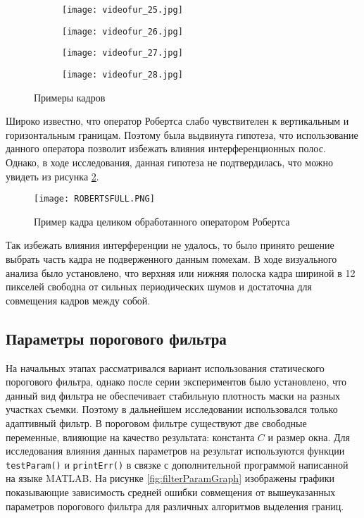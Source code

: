 \begin{figure}[h]
    \centering
    \begin{subfigure}{\textwidth}  
        \centering
        \texttt{[image: videofur\_25.jpg]}
        \smallskip 
    \end{subfigure}    
     \begin{subfigure}{\textwidth}  
        \centering
        \texttt{[image: videofur\_26.jpg]}        
        \smallskip 
    \end{subfigure}
     \begin{subfigure}{\textwidth}  
        \centering
        \texttt{[image: videofur\_27.jpg]}        
        \smallskip 
    \end{subfigure}
     \begin{subfigure}{\textwidth}  
        \centering
        \texttt{[image: videofur\_28.jpg]}
    \end{subfigure}

        \caption{Примеры кадров}
        \label{fig:semple}
\end{figure}

Широко известно, что оператор Робертса слабо чувствителен к вертикальным и горизонтальным границам. Поэтому была выдвинута гипотеза, что использование данного оператора позволит избежать влияния интерференционных полос. Однако, в ходе исследования, данная гипотеза не подтвердилась, что можно увидеть из рисунка \ref{fig:robertsComp}.
\begin{figure}
    \centering   
    \texttt{[image: ROBERTSFULL.PNG]} 
    \caption{Пример кадра целиком обработанного оператором Робертса}
    \label{fig:robertsComp}
\end{figure}
Так избежать влияния интерференции не удалось, то было принято решение выбрать часть кадра не подверженного данным помехам. В ходе визуального анализа было установлено, что верхняя или нижняя полоска кадра шириной в 12 пикселей свободна от сильных периодических шумов и достаточна для совмещения кадров между собой. 
\subsection{Параметры порогового фильтра}
На начальных этапах рассматривался вариант использования статического порогового фильтра, однако после серии экспериментов было установлено, что данный вид фильтра не обеспечивает стабильную плотность маски на разных участках съемки. Поэтому в дальнейшем исследовании использовался только адаптивный фильтр.
В пороговом фильтре существуют две свободные переменные, влияющие на качество результата: константа $C$ и размер окна. Для исследования влияния данных параметров на результат используются функции \texttt{testParam()} и \texttt{printErr()} в связке с дополнительной программой написанной на языке MATLAB. На рисунке \ref{fig:filterParamGraph} изображены графики показывающие зависимость средней ошибки совмещения от вышеуказанных параметров порогового фильтра для различных алгоритмов выделения границ.



\appendix